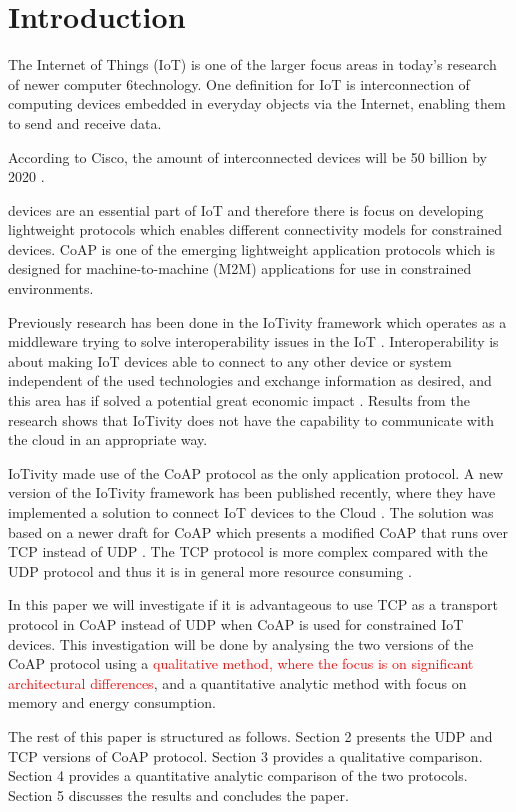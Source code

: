\section{Introduction}
The Internet of Things (IoT) is one of the larger focus areas in today's research of newer computer 6technology. One definition for IoT is interconnection of computing devices embedded in everyday objects via the Internet, enabling them to send and receive data.

According to Cisco, the amount of interconnected devices will be 50 billion by 2020 \cite{Micro80:online} \cite{Inter74:online}.

 devices are an essential part of IoT and therefore there is focus on developing lightweight protocols which enables different connectivity models for constrained devices.  
CoAP is one of the emerging lightweight application protocols which is designed for machine-to-machine (M2M) applications for use in constrained environments.   

Previously research has been done in the IoTivity framework which operates as a middleware trying to solve interoperability issues in the IoT \cite{interoperabilityChallenge}. Interoperability is about making IoT devices able to connect to any other device or system independent of the used technologies and exchange information as desired, and this area has if solved a potential great economic impact \cite{Unloc34:online}. 
Results from the research shows that IoTivity does not have the capability to communicate with the cloud in an appropriate way. 

IoTivity made use of the CoAP protocol as the only application protocol. 
A new version of the IoTivity framework has been published recently, where they have implemented a solution to connect IoT devices to the Cloud \cite{iotivity1.1}. The solution was based on a newer draft for CoAP \cite{ietf-core-coap-tcp-tls-02} which presents a modified CoAP that runs over TCP instead of UDP \cite{coapUDP}.
The TCP protocol is more complex compared with the UDP protocol and thus it is in general more resource consuming \cite{giannoulis2009tcp}.


In this paper we will investigate if it is advantageous to use TCP as a transport protocol in CoAP instead of UDP when CoAP is used for constrained IoT devices. This investigation will be done by analysing the two versions of the CoAP protocol using a \textcolor{red}{qualitative method, where the focus is on significant architectural differences}, and a quantitative analytic method with focus on memory and energy consumption. 

The rest of this paper is structured as follows.  Section 2 presents the UDP and TCP versions of CoAP protocol. Section 3 provides a qualitative comparison. Section 4 provides a quantitative analytic comparison of the two protocols. Section 5 discusses the results and concludes the paper.     
